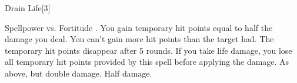 \begin{spellsection}{Drain Life}[3]
    \begin{spellheader}
    \end{spellheader}
    \begin{spellcontent}
        \begin{spelltargetinginfo}
        \end{spelltargetinginfo}
        \begin{spelleffects}
            \begin{spellattack}{Spellpower vs. Fortitude}
                \spellsuccess {}. You gain temporary hit points equal to half the damage you deal. You can't gain more hit points than the target had.
                The temporary hit points disappear after 5 rounds. If you take life damage, you lose all temporary hit points provided by this spell before applying the damage.
                \spellcritical As above, but double damage.
                \spellfailure Half damage.
            \end{spellattack}
        \end{spelleffects}
    \end{spellcontent}
    \begin{spellfooter}
        \miscastrandom
    \end{spellfooter}
    \begin{spellaugments}
    \end{spellaugments}
\end{spellsection}

